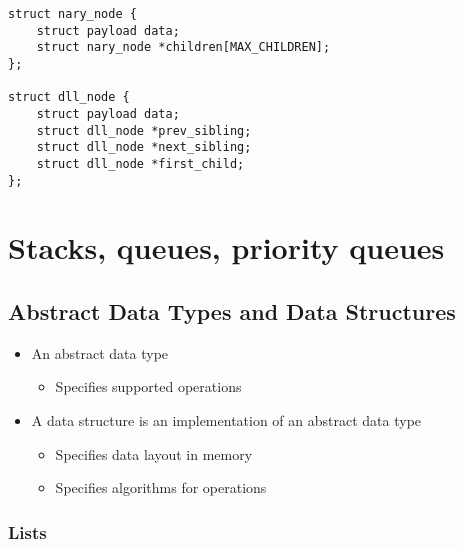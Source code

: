 \documentclass[12pt]{article}
\begin{document}
\begin{verbatim}
struct nary_node {
    struct payload data;
    struct nary_node *children[MAX_CHILDREN];
};

struct dll_node {
    struct payload data;
    struct dll_node *prev_sibling;
    struct dll_node *next_sibling;
    struct dll_node *first_child;
};
\end{verbatim}






















\newpage
\section{Stacks, queues, priority queues}

\subsection{Abstract Data Types and Data Structures}

\begin{itemize}
    \item An abstract data type
    \begin{itemize}
        \item Specifies supported operations
    \end{itemize}
    \item A data structure is an implementation of an abstract data type
    \begin{itemize}
        \item Specifies data layout in memory
        \item Specifies algorithms for operations
    \end{itemize}
\end{itemize}

\subsubsection{Lists}
\end{document}
